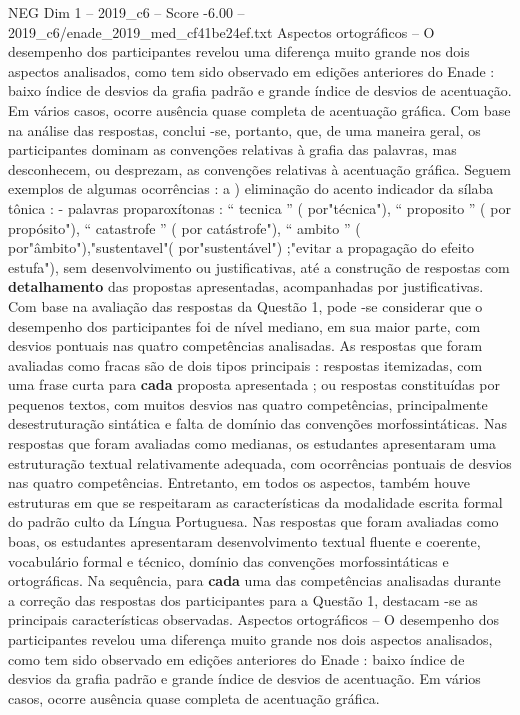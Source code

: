 \begin{textsample}{NEG Dim 1 – 2019\_c6 – Score -6.00 – 2019\_c6/enade\_2019\_med\_cf41be24ef.txt}
Aspectos ortográficos – O desempenho dos participantes revelou uma diferença muito grande nos dois aspectos analisados, como tem sido observado em edições anteriores do Enade : baixo índice de desvios da grafia padrão e grande índice de desvios de acentuação.
Em vários casos, ocorre ausência quase completa de acentuação gráfica.
Com base na análise das respostas, conclui -se, portanto, que, de uma maneira geral, os participantes dominam as convenções relativas à grafia das palavras, mas desconhecem, ou desprezam, as convenções relativas à acentuação gráfica.
Seguem exemplos de algumas ocorrências : a ) eliminação do acento indicador da sílaba tônica : - palavras proparoxítonas : “ tecnica ” ( por"técnica"), “ proposito ” ( por propósito"), “ catastrofe ” ( por catástrofe"), “ ambito ” ( por"âmbito"),"sustentavel"( por"sustentável") ;"evitar a propagação do efeito estufa"), sem desenvolvimento ou justificativas, até a construção de respostas com \textbf{detalhamento} das propostas apresentadas, acompanhadas por justificativas.
Com base na avaliação das respostas da Questão 1, pode -se considerar que o desempenho dos participantes foi de nível mediano, em sua maior parte, com desvios pontuais nas quatro competências analisadas.
As respostas que foram avaliadas como fracas são de dois tipos principais : respostas itemizadas, com uma frase curta para \textbf{cada} proposta apresentada ; ou respostas constituídas por pequenos textos, com muitos desvios nas quatro competências, principalmente desestruturação sintática e falta de domínio das convenções morfossintáticas.
Nas respostas que foram avaliadas como medianas, os estudantes apresentaram uma estruturação textual relativamente adequada, com ocorrências pontuais de desvios nas quatro competências.
Entretanto, em todos os aspectos, também houve estruturas em que se respeitaram as características da modalidade escrita formal do padrão culto da Língua Portuguesa.
Nas respostas que foram avaliadas como boas, os estudantes apresentaram desenvolvimento textual fluente e coerente, vocabulário formal e técnico, domínio das convenções morfossintáticas e ortográficas.
Na sequência, para \textbf{cada} uma das competências analisadas durante a correção das respostas dos participantes para a Questão 1, destacam -se as principais características observadas.
Aspectos ortográficos – O desempenho dos participantes revelou uma diferença muito grande nos dois aspectos analisados, como tem sido observado em edições anteriores do Enade : baixo índice de desvios da grafia padrão e grande índice de desvios de acentuação.
Em vários casos, ocorre ausência quase completa de acentuação gráfica.

\end{textsample}
